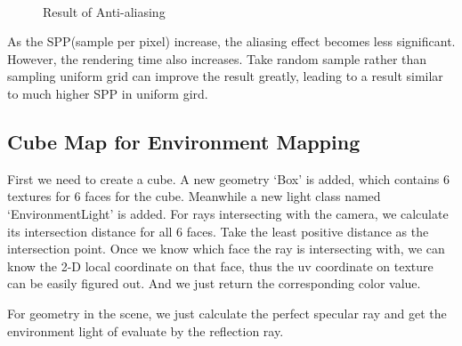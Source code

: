\documentclass[acmtog]{acmart}
\begin{document}
\begin{figure}[h]
    \centering
    \\
    \caption{Result of Anti-aliasing}
\end{figure}
    
As the SPP(sample per pixel) increase, the aliasing effect becomes less significant. However, the rendering time also increases. Take random sample rather than sampling uniform grid can improve the result greatly, leading to a result similar to much higher SPP in uniform gird.
    
\subsection{Cube Map for Environment Mapping}
First we need to create a cube. A new geometry `Box' is added, which contains 6 textures for 6 faces for the cube. Meanwhile a new light class named `EnvironmentLight' is added. For rays intersecting with the camera, we calculate its intersection distance for all 6 faces. Take the least positive distance as the intersection point. Once we know which face the ray is intersecting with, we can know the 2-D local coordinate on that face, thus the uv coordinate on texture can be easily figured out. And we just return the corresponding color value.
    
For geometry in the scene, we just calculate the perfect specular ray and get the environment light of evaluate by the reflection ray.
    
\end{document}
